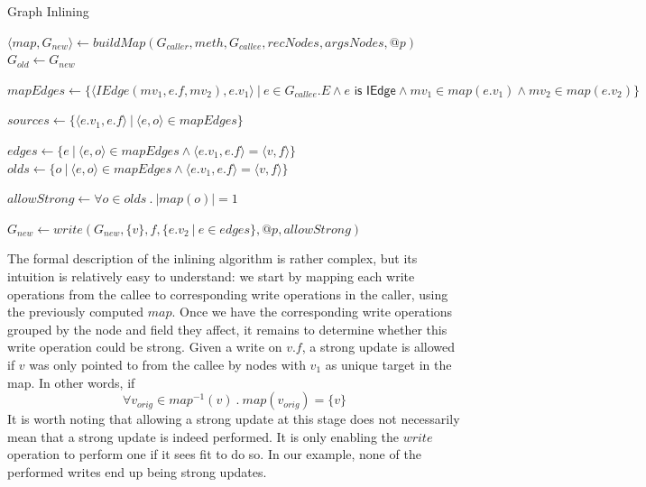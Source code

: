 \begin{algorithm}
\caption{Graph Inlining}\label{algo:pt:meth1}
\begin{algorithmic}[1]
    \State $\langle map, G_{new} \rangle \gets buildMap(G_{caller}, meth, G_{callee}, recNodes, argsNodes, @p)$
    \Repeat
        \State $G_{old} \gets G_{new}$

        \State $mapEdges \gets \{ \langle IEdge(mv_1, e.f, mv_2), e.v_1 \rangle
        ~|~ e \in G_{callee}.E \land e \textsf{ is IEdge} \land mv_1 \in
        map(e.v_1) \land mv_2 \in map(e.v_2) \}$

        \State $sources \gets \{ \langle e.v_1, e.f \rangle ~|~ \langle e, o \rangle \in mapEdges \}$

            \State $edges \gets \{ e ~|~ \langle e, o \rangle \in mapEdges \land \langle e.v_1, e.f \rangle = \langle v, f\rangle \}$
            \State $olds  \gets \{ o ~|~ \langle e, o \rangle \in mapEdges \land \langle e.v_1, e.f \rangle = \langle v, f\rangle \}$

            \State $allowStrong \gets \forall o \in olds~.~|map(o)| = 1$

            \State $G_{new} \gets write(G_{new}, \{ v \}, f, \{ e.v_2 ~|~ e \in edges \}, @p, allowStrong)$
        \EndFor
\EndFunction
\end{algorithmic}
\end{algorithm}

The formal description of the inlining algorithm is rather complex, but its
intuition is relatively easy to understand: we start by mapping each write
operations from the callee to corresponding write operations in the caller,
using the previously computed $map$. Once we have the corresponding write
operations grouped by the node and field they affect, it remains to determine
whether this write operation could be strong. Given a write on $v.f$, a
strong update is allowed if $v$ was only pointed to from the callee by nodes
with $v_1$ as unique target in the map. In other words, if 
$$
\forall v_{orig} \in map^{-1}(v)~.~ map(v_{orig}) = \{ v \}
$$
It is worth noting that allowing a strong update at this stage does not
necessarily mean that a strong update is indeed performed. It is only
enabling the $write$ operation to perform one if it sees fit to do so. In our
example, none of the performed writes end up being strong updates.

